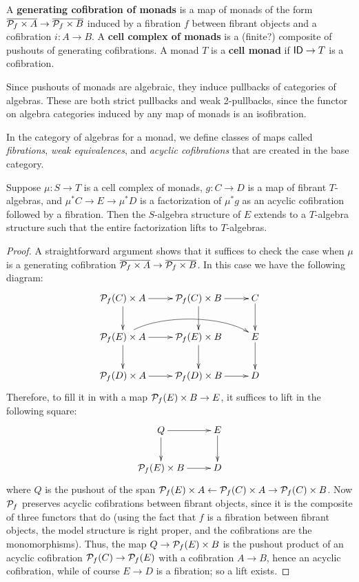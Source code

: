 \documentclass{amsart}
\begin{document}
\begin{defn}
  A \textbf{generating cofibration of monads} is a map of monads of the form $\overline{ \mathcal{P}_{f} \times A} \to \overline{\mathcal{P}_{f} \times B}$ induced by a fibration $f$ between fibrant objects and a cofibration $i:A\to B$.
  A \textbf{cell complex of monads} is a (finite?) composite of pushouts of generating cofibrations.
  A monad $T$ is a \textbf{cell monad} if $\mathsf{ID} \to T$ is a cofibration.
\end{defn}

Since pushouts of monads are algebraic, they induce pullbacks of categories of algebras.
These are both strict pullbacks and weak 2-pullbacks, since the functor on algebra categories induced by any map of monads is an isofibration.

In the category of algebras for a monad, we define classes of maps called \emph{fibrations}, \emph{weak equivalences}, and \emph{acyclic cofibrations} that are created in the base category.

\begin{lem}\label{thm:moncof-plfib}
  Suppose $\mu:S\to T$ is a cell complex of monads, $g:C\to D$ is a map of fibrant $T$-algebras, and $\mu^*C \to E \to \mu^*D$ is a factorization of $\mu^*g$ as an acyclic cofibration followed by a fibration.
  Then the $S$-algebra structure of $E$ extends to a $T$-algebra structure such that the entire factorization lifts to $T$-algebras.
\end{lem}
\begin{proof}
  A straightforward argument shows that it suffices to check the case when $\mu$ is a generating cofibration $\overline{ \mathcal{P}_{f} \times A} \to \overline{\mathcal{P}_{f} \times B}$.
  In this case we have the following diagram:
  \begin{equation}
  \vcenter{\xymatrix{
      \poly f(C) \times A\ar[r]\ar[d] &
      \poly f(C) \times B\ar[r]\ar[d] &
      C\ar[d]\\
      \poly f(E) \times A\ar[r]\ar[d] \ar@(ur,ul)[rr] &
      \poly f(E) \times B \ar[d] &
      E\ar[d]\\
      \poly f(D) \times A\ar[r] &
      \poly f(D) \times B\ar[r] &
      D
      }}
\end{equation}
Therefore, to fill it in with a map $\mathcal{P}_{f}(E)\times B\to E$, it suffices to lift in the following square:
\begin{equation}
  \vcenter{\xymatrix{
      Q\ar[r]\ar[d] &
      E\ar[d]\\
      \poly f(E) \times B \ar[r] &
      D
      }}
\end{equation}
where $Q$ is the pushout of the span $\mathcal{P}_{f}(E)\times A \leftarrow \mathcal{P}_{f}(C)\times A \to \mathcal{P}_{f}(C) \times B$.
Now $\mathcal{P}_{f}$ preserves acyclic cofibrations between fibrant objects, since it is the composite of three functors that do (using the fact that $f$ is a fibration between fibrant objects, the model structure is right proper, and the cofibrations are the monomorphisms).
Thus, the map $Q \to \mathcal{P}_{f}(E) \times B$ is the pushout product of an acyclic cofibration $\mathcal{P}_{f}(C) \to \mathcal{P}_{f}(E)$ with a cofibration $A\to B$, hence an acyclic cofibration, while of course $E\to D$ is a fibration; so a lift exists.
\end{proof}
\end{document}
